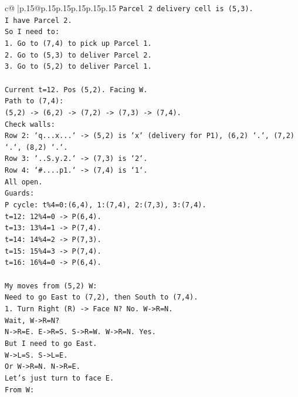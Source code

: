 \documentclass{article}
\begin{document}
{\begin{supertabular}{c@{$\;$}|p{.15\linewidth}@{}p{.15\linewidth}p{.15\linewidth}p{.15\linewidth}p{.15\linewidth}p{.15\linewidth}}
{{{\texttt{Parcel 2 delivery cell is (5,3).} \\
\texttt{I have Parcel 2.} \\
\texttt{So I need to:} \\
\texttt{1. Go to (7,4) to pick up Parcel 1.} \\
\texttt{2. Go to (5,3) to deliver Parcel 2.} \\
\texttt{3. Go to (5,2) to deliver Parcel 1.} \\
\\ 
\texttt{Current t=12. Pos (5,2). Facing W.} \\
\texttt{Path to (7,4):} \\
\texttt{(5,2) {-}> (6,2) {-}> (7,2) {-}> (7,3) {-}> (7,4).} \\
\texttt{Check walls:} \\
\texttt{Row 2: `q...x...` {-}> (5,2) is `x` (delivery for P1), (6,2) `.`, (7,2) `.`, (8,2) `.`.} \\
\texttt{Row 3: `..S.y.2.` {-}> (7,3) is `2`.} \\
\texttt{Row 4: `\#....p1.` {-}> (7,4) is `1`.} \\
\texttt{All open.} \\
\texttt{Guards:} \\
\texttt{P cycle: t\%4=0:(6,4), 1:(7,4), 2:(7,3), 3:(7,4).} \\
\texttt{t=12: 12\%4=0 {-}> P(6,4).} \\
\texttt{t=13: 13\%4=1 {-}> P(7,4).} \\
\texttt{t=14: 14\%4=2 {-}> P(7,3).} \\
\texttt{t=15: 15\%4=3 {-}> P(7,4).} \\
\texttt{t=16: 16\%4=0 {-}> P(6,4).} \\
\\ 
\texttt{My moves from (5,2) W:} \\
\texttt{Need to go East to (7,2), then South to (7,4).} \\
\texttt{1. Turn Right (R) {-}> Face N? No. W{-}>R=N.} \\
\texttt{Wait, W{-}>R=N?} \\
\texttt{N{-}>R=E. E{-}>R=S. S{-}>R=W. W{-}>R=N. Yes.} \\
\texttt{But I need to go East.} \\
\texttt{W{-}>L=S. S{-}>L=E.} \\
\texttt{Or W{-}>R=N. N{-}>R=E.} \\
\texttt{Let's just turn to face E.} \\
\texttt{From W:} \\
}}}
\end{supertabular}}
\end{document}
